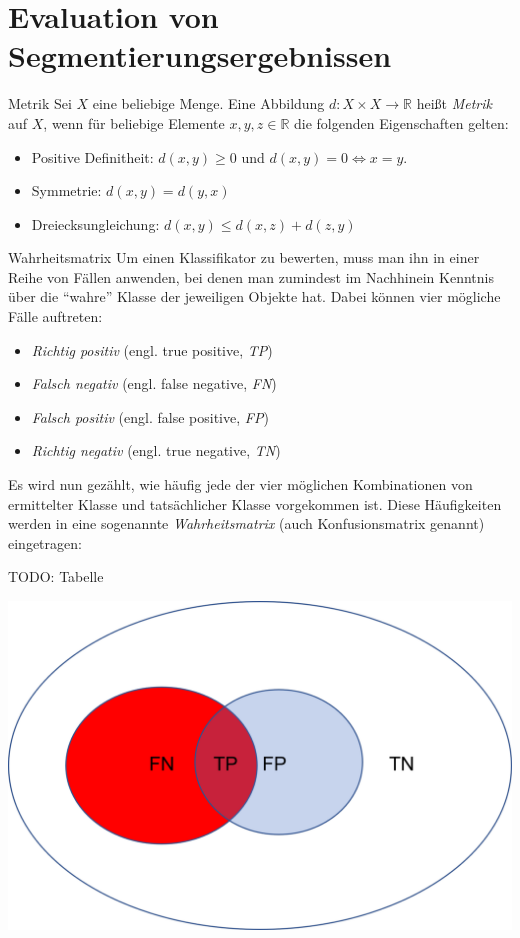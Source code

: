 \section{Evaluation von Segmentierungsergebnissen}

\begin{defi}{Metrik}
    Sei $X$ eine beliebige Menge.
    Eine Abbildung $d: X \times X \to \mathbb {R}$ heißt \emph{Metrik} auf $X$, wenn für beliebige Elemente $x, y, z \in \mathbb{R}$ die folgenden Eigenschaften gelten:
    \begin{itemize}
        \item Positive Definitheit: $d(x, y) \geq 0$ und $d(x, y) = 0 \iff x = y$.
        \item Symmetrie: $d(x, y) = d(y, x)$
        \item Dreiecksungleichung: $d(x, y) \leq d(x, z) + d(z, y)$
    \end{itemize}
\end{defi}

\begin{defi}{Wahrheitsmatrix}
    Um einen Klassifikator zu bewerten, muss man ihn in einer Reihe von Fällen anwenden, bei denen man zumindest im Nachhinein Kenntnis über die \enquote{wahre} Klasse der jeweiligen Objekte hat.
    Dabei können vier mögliche Fälle auftreten:
    \begin{itemize}
        \item \emph{Richtig positiv} (engl. true positive, \emph{TP})
        \item \emph{Falsch negativ} (engl. false negative, \emph{FN})
        \item \emph{Falsch positiv} (engl. false positive, \emph{FP})
        \item \emph{Richtig negativ} (engl. true negative, \emph{TN})
    \end{itemize}

    Es wird nun gezählt, wie häufig jede der vier möglichen Kombinationen von ermittelter Klasse und tatsächlicher Klasse vorgekommen ist.
    Diese Häufigkeiten werden in eine sogenannte \emph{Wahrheitsmatrix} (auch Konfusionsmatrix genannt) eingetragen:

    TODO: Tabelle

    \centering
    \includegraphics[width=.5\linewidth]{figures/wahrheitsmatrix_venn.png}
\end{defi}

